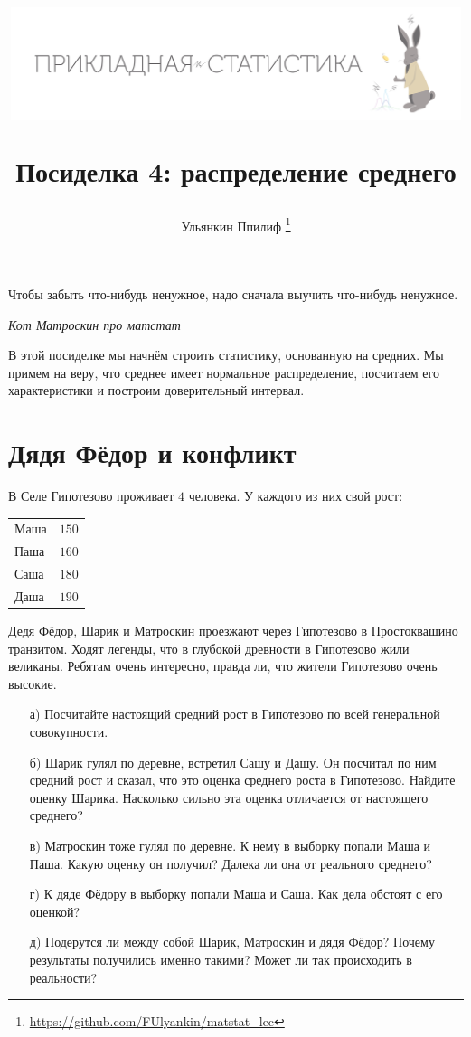 \documentclass[12pt, a4paper, oneside]{article}
\title{
\begin{center} 
\includegraphics[width=0.99\textwidth]{logo.png}
\end{center}

Посиделка 4: распределение среднего}
\date{ } %
\author{Ульянкин Ппилиф \thanks{\url{https://github.com/FUlyankin/matstat_lec}}}
\begin{document}

\maketitle

\epigraph{Чтобы забыть что-нибудь ненужное, надо сначала выучить что-нибудь ненужное.}{\textit{Кот Матроскин про матстат}}

В этой посиделке мы начнём строить статистику, основанную на средних. Мы примем на веру, что среднее имеет нормальное распределение, посчитаем его характеристики и построим доверительный интервал. 

\section{Дядя Фёдор и конфликт}

В Селе  Гипотезово проживает $4$ человека. У каждого из них свой рост:

\begin{center}
	\begin{tabular}{lc}
		\toprule
		Маша &  $150$\\
		Паша &  $160$\\
		Саша &  $180$\\
		Даша &  $190$\\ 
		\bottomrule
	\end{tabular}	
\end{center}

Дедя Фёдор, Шарик и Матроскин проезжают через Гипотезово в Простоквашино транзитом. Ходят легенды, что в глубокой древности в Гипотезово жили великаны. Ребятам очень интересно, правда ли, что жители Гипотезово очень высокие.

\begin{enumerate} 
	\item[а)] Посчитайте настоящий средний рост в Гипотезово по всей генеральной совокупности.
	\item[б)] Шарик гулял по деревне, встретил Сашу и Дашу. Он посчитал по ним средний рост и сказал, что это оценка среднего роста в Гипотезово. Найдите оценку Шарика. Насколько сильно эта оценка отличается от настоящего среднего? 
	\item[в)] Матроскин тоже гулял по деревне. К нему в выборку попали Маша и Паша. Какую оценку он получил? Далека ли она от реального среднего? 
	\item[г)] К дяде Фёдору в выборку попали Маша и Саша. Как дела обстоят с его оценкой? 
	\item[д)] Подерутся ли между собой Шарик, Матроскин и дядя Фёдор? Почему результаты получились именно такими? Может ли так происходить в реальности? 
\end{enumerate} 
\end{document}
